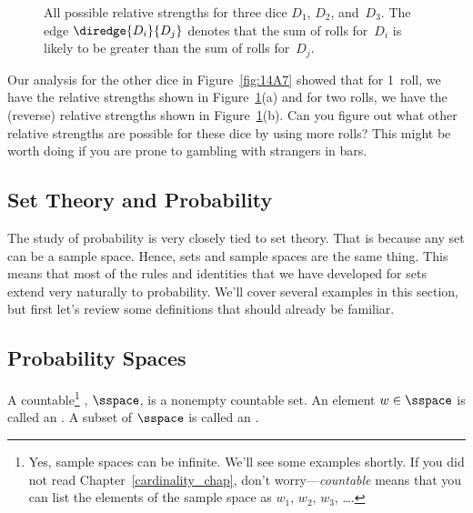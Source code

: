 \begin{figure}


\caption{All possible relative strengths for three dice $D_1$, $D_2$,
  and~$D_3$.  The edge $\diredge{D_i}{D_j}$ denotes that the sum of
  rolls for~$D_i$ is likely to be greater than the sum of rolls
  for~$D_j$.}

\label{fig:14A13}

\end{figure}

Our analysis for the other dice in Figure~\ref{fig:14A7} showed that
for 1~roll, we have the relative strengths shown in
Figure~\ref{fig:14A13}(a) and for two rolls, we have the (reverse)
relative strengths shown in Figure~\ref{fig:14A13}(b). Can you figure
out what other relative strengths are possible for these dice by using
more rolls?  This might be worth doing if you are prone to gambling
with strangers in bars.

\subsection{Set Theory and Probability}

The study of probability is very closely tied to set theory.  That is
because any set can be a sample space.  Hence, sets and sample spaces
are the same thing.  This means that most of the rules and identities
that we have developed for sets extend very naturally to probability.
We'll cover several examples in this section, but first let's review
some definitions that should already be familiar.

\subsection{Probability Spaces}

\begin{definition}\label{LN12:sampsp}
  A countable\footnote{Yes, sample spaces can be infinite.  We'll see
    some examples shortly.  If you did not read
    Chapter~\ref{cardinality_chap}, don't worry---\emph{countable}
    means that you can list the elements of the sample space as $w_1$,
    $w_2$, $w_3$, \dots.} , $\sspace$, is a
  nonempty countable set.  An element $w \in \sspace$ is called an
  .  A subset of $\sspace$ is called an .
\end{definition}

